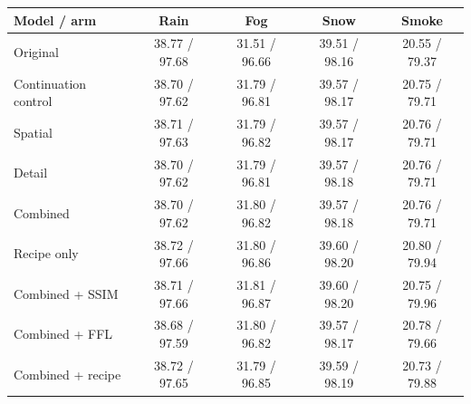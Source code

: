 \begin{center}\begin{minipage}{\linewidth}
\centering\small
{}
\label{tab:jointweather}
\begin{tabular}{@{}lcccc@{}}\toprule
Model / arm & Rain & Fog & Snow & Smoke\\\midrule
Original & 38.77 / 97.68 & 31.51 / 96.66 & 39.51 / 98.16 & 20.55 / 79.37\\
Continuation control & 38.70 / 97.62 & 31.79 / 96.81 & 39.57 / 98.17 & 20.75 / 79.71\\
Spatial & 38.71 / 97.63 & 31.79 / 96.82 & 39.57 / 98.17 & 20.76 / 79.71\\
Detail & 38.70 / 97.62 & 31.79 / 96.81 & 39.57 / 98.18 & 20.76 / 79.71\\
Combined & 38.70 / 97.62 & 31.80 / 96.82 & 39.57 / 98.18 & 20.76 / 79.71\\
Recipe only & 38.72 / 97.66 & 31.80 / 96.86 & 39.60 / 98.20 & 20.80 / 79.94\\
Combined + SSIM & 38.71 / 97.66 & 31.81 / 96.87 & 39.60 / 98.20 & 20.75 / 79.96\\
Combined + FFL & 38.68 / 97.59 & 31.80 / 96.82 & 39.57 / 98.17 & 20.78 / 79.66\\
Combined + recipe & 38.72 / 97.65 & 31.79 / 96.85 & 39.59 / 98.19 & 20.73 / 79.88\\
\bottomrule\end{tabular}
\end{minipage}\end{center}
